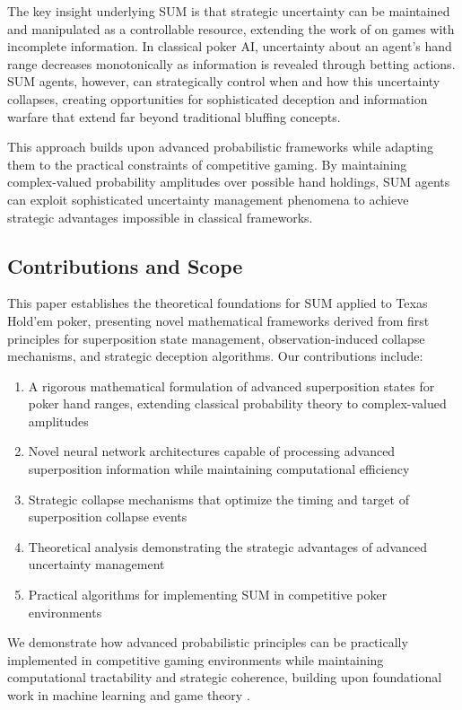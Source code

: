 \documentclass[11pt,a4paper]{article}
\begin{document}
The key insight underlying SUM is that strategic uncertainty can be maintained and manipulated as a controllable resource, extending the work of \citet{harsanyi1967games} on games with incomplete information. In classical poker AI, uncertainty about an agent's hand range decreases monotonically as information is revealed through betting actions. SUM agents, however, can strategically control when and how this uncertainty collapses, creating opportunities for sophisticated deception and information warfare that extend far beyond traditional bluffing concepts.

This approach builds upon advanced probabilistic frameworks while adapting them to the practical constraints of competitive gaming. By maintaining complex-valued probability amplitudes over possible hand holdings, SUM agents can exploit sophisticated uncertainty management phenomena to achieve strategic advantages impossible in classical frameworks.

\subsection{Contributions and Scope}

This paper establishes the theoretical foundations for SUM applied to Texas Hold'em poker, presenting novel mathematical frameworks derived from first principles for superposition state management, observation-induced collapse mechanisms, and strategic deception algorithms. Our contributions include:

\begin{enumerate}
\item A rigorous mathematical formulation of advanced superposition states for poker hand ranges, extending classical probability theory to complex-valued amplitudes
\item Novel neural network architectures capable of processing advanced superposition information while maintaining computational efficiency
\item Strategic collapse mechanisms that optimize the timing and target of superposition collapse events
\item Theoretical analysis demonstrating the strategic advantages of advanced uncertainty management
\item Practical algorithms for implementing SUM in competitive poker environments
\end{enumerate}

We demonstrate how advanced probabilistic principles can be practically implemented in competitive gaming environments while maintaining computational tractability and strategic coherence, building upon foundational work in machine learning \citep{mnih2015human} and game theory \citep{nash1950equilibrium}.
\end{document}
